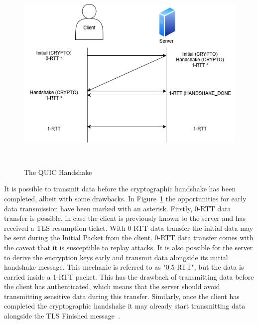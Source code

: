 \documentclass[english, 12pt, a4paper, elec, utf8, a-2b, online]{aaltothesis}
\begin{document}
\begin{figure}[h]
	\centering
	\includegraphics[alt={Diagram of QUIC handshake between a client and a server}, height=9cm]{./images/quic_handshake.png}
	\caption{The QUIC Handshake}
	\label{fig:quic_handshake}
\end{figure}

It is possible to transmit data before the cryptographic handshake has been completed,
albeit with some drawbacks. In Figure~\ref{fig:quic_handshake} the opportunities
for early data transmission have been marked with an asterisk. Firstly, 0-RTT data
transfer is possible, in case the client is previously known to the server and
has received a TLS resumption ticket. With 0-RTT data transfer the initial data may be sent during the Initial Packet
from the client. 0-RTT data transfer comes with the caveat that it is susceptible
to replay attacks. It is also possible for the server to derive the encryption keys
early and transmit data alongside its initial handshake message. This mechanic is
referred to as "0.5-RTT", but the data is carried inside a 1-RTT packet. This has
the drawback of transmitting data before the client has authenticated, which means
that the server should avoid transmitting sensitive data during this transfer. Similarly,
once the client has completed the cryptographic handshake it may already start
transmitting data alongside the TLS Finished message~\cite{rfc9000, rfc9001}.
\end{document}
